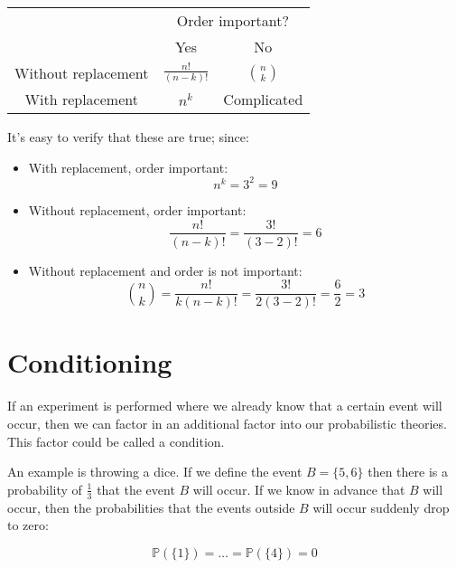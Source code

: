\begin{center}
\begin{tabular}{|c|c|c|}
	\hline
	& \multicolumn{2}{c|}{Order important?}\\
	\cline{2-3}
	& Yes & No\\ \hline
	Without replacement & $\frac{n!}{(n-k)!}$ & $n \choose k$\\ \hline
	With replacement & $n^k$ & Complicated\\ \hline
\end{tabular}
\end{center}

It's easy to verify that these are true; since:

\begin{itemize}
	\item With replacement, order important:
	\begin{dmath*}
		n^k = 3^2 = 9
	\end{dmath*}
	\item Without replacement, order important:
	\begin{dmath*}
		\frac{n!}{(n - k)!} = 	\frac{3!}{(3 - 2)!} = 6
	\end{dmath*}
	\item Without replacement and order is not important:
	\begin{dmath*}
		{n \choose k} = \frac{n!}{k(n - k)!} = \frac{3!}{2(3 - 2)!} = \frac{6}{2} = 3
	\end{dmath*}

\end{itemize}



\section{Conditioning}

If an experiment is performed where we already know that a certain event will
occur, then we can factor in an additional factor into our probabilistic
theories. This factor could be called a condition.

An example is throwing a dice. If we define the event $B = \{5, 6\}$ then there
is a probability of $\frac{1}{3}$ that the event $B$ will occur. If we know in
advance that $B$ will occur, then the probabilities that the events outside $B$
will occur suddenly drop to zero:

\begin{dmath*}
	{\mathbb{P}(\{1\}) = \dots = \mathbb{P}(\{4\}) = 0}
\end{dmath*}

